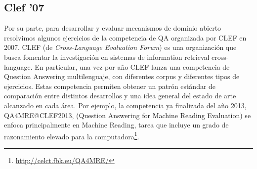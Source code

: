 \subsection{Clef '07}
\label{subsec:clef07}
\horrible
Por su parte, para desarrollar y evaluar mecanismos de dominio abierto resolvimos algunos ejercicios de la competencia de QA organizada por CLEF 
en 2007. 
CLEF (de \textit{Cross-Language Evaluation Forum}) es una organización que busca fomentar la investigación en sistemas de information retrieval cross-language. 
En particular, una vez por año CLEF lanza una competencia de Question Answering multilenguaje, con diferentes corpus y diferentes tipos de ejercicios. Estas competencia permiten obtener un patrón estándar de comparación entre distintos desarrollos y una idea general del estado de arte alcanzado en cada área.
Por ejemplo, la competencia ya finalizada del año 2013, QA4MRE@CLEF2013, (Question Answering for Machine Reading Evaluation) se enfoca principalmente en Machine Reading, tarea que incluye un grado de razonamiento elevado para la computadora\footnote{\url{http://celct.fbk.eu/QA4MRE/}}.

